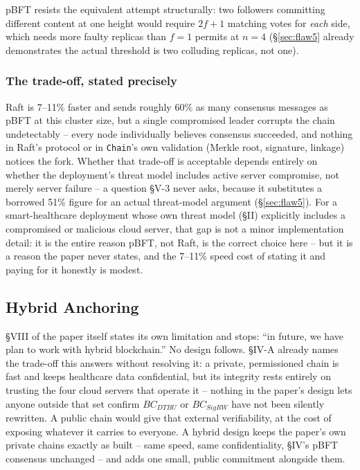 \documentclass[conference]{IEEEtran}
\begin{document}
pBFT resists the equivalent attempt structurally: two followers committing different content at
one height would require $2f+1$ matching votes for \emph{each} side, which needs more faulty
replicas than $f=1$ permits at $n=4$ (\S\ref{sec:flaw5} already demonstrates the actual threshold
is two colluding replicas, not one).

\subsubsection{The trade-off, stated precisely}

Raft is 7--11\% faster and sends roughly 60\% as many consensus messages as pBFT at this cluster
size, but a single compromised leader corrupts the chain undetectably -- every node individually
believes consensus succeeded, and nothing in Raft's protocol or in \texttt{Chain}'s own validation
(Merkle root, signature, linkage) notices the fork. Whether that trade-off is acceptable depends
entirely on whether the deployment's threat model includes active server compromise, not merely
server failure -- a question \S V-3 never asks, because it substitutes a borrowed 51\% figure for
an actual threat-model argument (\S\ref{sec:flaw5}). For a smart-healthcare deployment whose own
threat model (\S II) explicitly includes a compromised or malicious cloud server, that gap is not
a minor implementation detail: it is the entire reason pBFT, not Raft, is the correct choice here
-- but it is a reason the paper never states, and the 7--11\% speed cost of stating it and paying
for it honestly is modest.

\subsection{Hybrid Anchoring}
\label{sec:hybrid}

\S VIII of the paper itself states its own limitation and stops: ``in future, we have plan to
work with hybrid blockchain.'' No design follows. \S IV-A already names the trade-off this answers
without resolving it: a private, permissioned chain is fast and keeps healthcare data
confidential, but its integrity rests entirely on trusting the four cloud servers that operate
it -- nothing in the paper's design lets anyone outside that set confirm $BC_{DTBU}$ or
$BC_{SigRW}$ have not been silently rewritten. A public chain would give that external
verifiability, at the cost of exposing whatever it carries to everyone. A hybrid design keeps the
paper's own private chains exactly as built -- same speed, same confidentiality, \S IV's pBFT
consensus unchanged -- and adds one small, public commitment alongside them.
\end{document}
